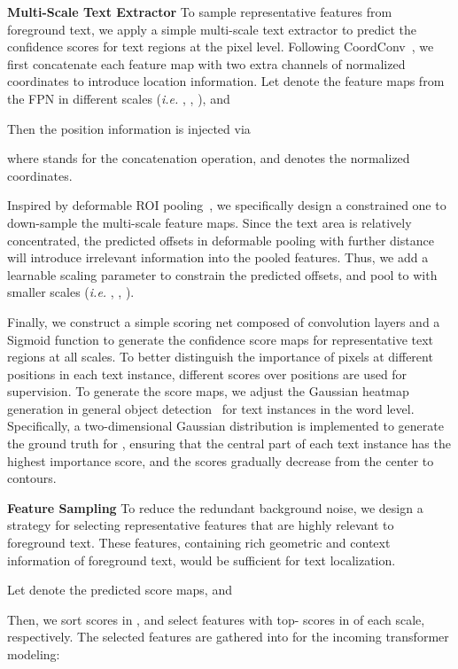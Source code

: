 \documentclass[10pt,twocolumn,letterpaper]{article}
\begin{document}
\textbf{Multi-Scale Text Extractor}
To sample representative features from foreground text, we apply a simple multi-scale text extractor to predict the confidence scores for text regions at the pixel level.
Following CoordConv~\cite{Coord}, we first concatenate each feature map with two extra channels of normalized coordinates to introduce location information.
Let  denote the feature maps from the FPN in different scales (\emph{i.e.} , , ), and

Then the position information is injected via

where  stands for the concatenation operation, and  denotes the normalized coordinates.

Inspired by deformable ROI pooling~\cite{DCN}, 
we specifically design a constrained one to down-sample the multi-scale feature maps.
Since the text area is relatively concentrated, the predicted offsets in deformable pooling with further distance will introduce irrelevant information into the pooled features.
Thus, we add a learnable scaling parameter to constrain the predicted offsets, and pool  to  with smaller scales (\emph{i.e.} , , ).

Finally, we construct a simple scoring net  composed of convolution layers and a Sigmoid function to generate the confidence score maps for representative text regions at all scales.
To better distinguish the importance of pixels at different positions in each text instance, different scores over positions are used for supervision.
To generate the score maps, we adjust the Gaussian heatmap generation in general object detection~\cite{duan2019centernet,law2018cornernet} for text instances in the word level.
Specifically, a two-dimensional Gaussian distribution is implemented to generate the ground truth  for , ensuring that the central part of each text instance has the highest importance score, and the scores gradually decrease from the center to contours.


\textbf{Feature Sampling}
To reduce the redundant background noise, we design a strategy for selecting representative features that are highly relevant to foreground text. These features, containing rich geometric and context information of foreground text, would be sufficient for text localization.

Let  denote the predicted score maps, and

Then, we sort scores in , and select features with top- scores in  of each scale, respectively.
The selected features are gathered into  for the incoming transformer modeling:
\end{document}
